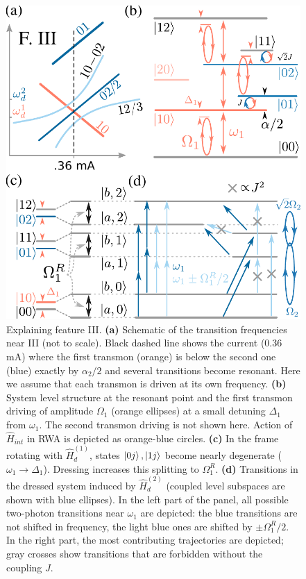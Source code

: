 \documentclass[%
 aps, prx,
 amsmath,amssymb,
 reprint,%
superscriptaddress
]{revtex4-2}
\begin{document}
\begin{figure}
	\centering
	\includegraphics[width=\linewidth]{main_scheme_2}  
	\caption{Explaining feature III. \textbf{(a)} 
	Schematic of the transition frequencies near 
	III (not to scale). Black dashed line shows the 
	current (0.36 mA) where the first transmon 
	(orange) is below the second one (blue) 
	exactly by $\alpha_2/2$ and several 
	transitions become resonant. Here we assume 
	that each transmon is driven at its own 
	frequency. \textbf{(b)} System level 
	structure at the resonant point and the first transmon 
	driving of amplitude $\Omega_1$ 
	(orange ellipses) at a small detuning 
	$\Delta_1$ from $\omega_1$. The second 
	transmon driving is not shown here. Action of 
	$\hat H_{int}$ in RWA is depicted as 
	orange-blue circles. \textbf{(c)} In the 
	frame rotating with $\hat 
	H_{d}^{(1)}$, states $\ket{0j},\ket{1j}$ 
	become nearly degenerate ($\omega_1 
	\rightarrow \Delta_1$). Dressing increases this splitting to 
	$\Omega_1^R$. \textbf{(d)} Transitions in the 
	dressed system induced by $\hat 
	H_{d}^{(2)}$ (coupled level subspaces are shown with blue ellipses). In 
	the left part of the panel, all possible 
	two-photon transitions near $\omega_1$ are 
	depicted: the blue transitions are not 
	shifted in frequency, the light blue ones are shifted 
	by $\pm\Omega^R_1/2$. In the right 
	part, the most contributing trajectories are 
	depicted; gray crosses show transitions that 
	are forbidden without the coupling $J$.}
	\label{fig:main_scheme}
\end{figure}
\end{document}
